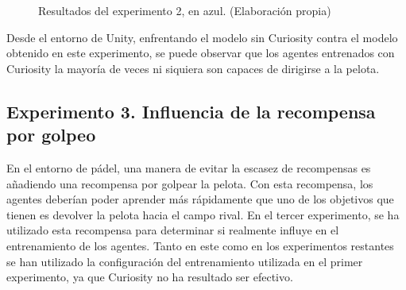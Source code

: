 \begin{figure} [H]
 \centering
 \caption[Resultados del experimento 2]{Resultados del experimento 2, en azul. (Elaboración propia)}
 \label{fig:exp2-plots}
\end{figure}

Desde el entorno de Unity, enfrentando el modelo sin Curiosity contra el modelo obtenido en este experimento, se puede observar que los agentes entrenados con Curiosity la mayoría de veces ni siquiera son capaces de dirigirse a la pelota.

\subsection{Experimento 3. Influencia de la recompensa por golpeo}

En el entorno de pádel, una manera de evitar la escasez de recompensas es añadiendo una recompensa por golpear la pelota. Con esta recompensa, los agentes deberían poder aprender más rápidamente que uno de los objetivos que tienen es devolver la pelota hacia el campo rival. En el tercer experimento, se ha utilizado esta recompensa para determinar si realmente influye en el entrenamiento de los agentes. Tanto en este como en los experimentos restantes se han utilizado la configuración del entrenamiento utilizada en el primer experimento, ya que Curiosity no ha resultado ser efectivo.

